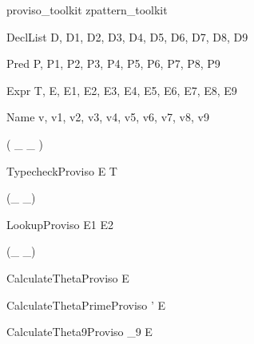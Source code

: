 \documentclass{article}
\begin{document}
\begin{zsection}
  \SECTION proviso\_toolkit \parents zpattern\_toolkit
\end{zsection}

\begin{zedjoker}{DeclList} D, D1, D2, D3, D4, D5, D6, D7, D8, D9 \end{zedjoker}
\begin{zedjoker}{Pred} P, P1, P2, P3, P4, P5, P6, P7, P8, P9 \end{zedjoker}
\begin{zedjoker}{Expr} T, E, E1, E2, E3, E4, E5, E6, E7, E8, E9 \end{zedjoker}
\begin{zedjoker}{Name} v, v1, v2, v3, v4, v5, v6, v7, v8, v9 \end{zedjoker}


\begin{zed}
  \relation ( \_ \hasType \_ )
\end{zed}

\begin{zedproviso}{TypecheckProviso}
  E \hasType T
\end{zedproviso}




\begin{zed}
  \relation (\_ \hasDefn \_)
\end{zed}

\begin{zedproviso}{LookupProviso}
  E1 \hasDefn E2
\end{zedproviso}




\begin{zed}
  \relation (\_ \is \_)
\end{zed}

\begin{zedproviso}{CalculateThetaProviso}
  \theta [D | true] \is E
\end{zedproviso}

\begin{zedproviso}{CalculateThetaPrimeProviso}
  \theta [D | true] ' \is E
\end{zedproviso}

\begin{zedproviso}{CalculateTheta9Proviso}
  \theta [D | true] _9 \is E
\end{zedproviso}
\end{document}

